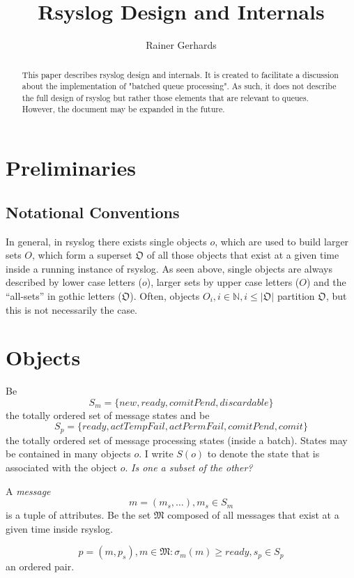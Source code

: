 \documentclass[a4paper,10pt]{article}
\title{Rsyslog Design and Internals}
\author{Rainer Gerhards}
\newcommand{\IN}{\mathbb{N}}
\newcommand{\MM}{\mathfrak{M}}
\begin{document}
\maketitle

\begin{abstract}
This paper describes rsyslog design and internals. It is created to facilitate a discussion about the implementation of "batched queue processing". As such, it does not describe the full design of rsyslog but rather those elements that are relevant to queues. However, the document may be expanded in the future.
\end{abstract}

\section{Preliminaries}
\subsection{Notational Conventions}
In general, in rsyslog there exists single objects $o$, which are used to build larger sets $O$, which form a superset $\mathfrak{O}$ of all those objects that exist at a given time inside a running instance of rsyslog. As seen above, single objects are always described by lower case letters ($o$), larger sets by upper case letters ($O$) and the ``all-sets'' in gothic letters ($\mathfrak{O}$). Often, objects $O_i, i \in \IN, i \le |\mathfrak{O}|$ partition $\mathfrak{O}$, but this is not necessarily the case.
\section{Objects}
Be 
$$S_m = \{ new, ready, comitPend, discardable \}$$
the totally ordered set of message states and be
$$S_p = \{ ready,  actTempFail, actPermFail, comitPend, comit\}$$
the totally ordered set of message processing states (inside a batch). States may be contained in many objects $o$. I write $S(o)$ to denote the state that is associated with the object $o$.
\emph{Is one a subset of the other?}

A \emph{message}
$$m = (m_s, \ldots), m_s \in S_m$$
is a tuple of attributes. Be the set $\MM$ composed of all messages that exist at a given time inside rsyslog.

$$p = (m, p_s), m \in \MM : \sigma_m(m) \geq ready, s_p \in S_p$$
an ordered pair.
\end{document}
